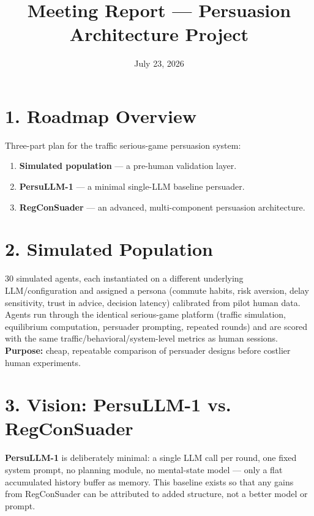 \documentclass[10pt]{article}
\title{\vspace{-1.5em}\large\textbf{Meeting Report --- Persuasion Architecture Project}}
\author{}
\date{\vspace{-1em}July 23, 2026}
\begin{document}
\maketitle
\vspace{-1.5em}

\section*{1. Roadmap Overview}
Three-part plan for the traffic serious-game persuasion system:
\begin{enumerate}
  \item \textbf{Simulated population} --- a pre-human validation layer.
  \item \textbf{PersuLLM-1} --- a minimal single-LLM baseline persuader.
  \item \textbf{RegConSuader} --- an advanced, multi-component persuasion architecture.
\end{enumerate}

\section*{2. Simulated Population}
30 simulated agents, each instantiated on a different underlying LLM/configuration and assigned a persona (commute habits, risk aversion, delay sensitivity, trust in advice, decision latency) calibrated from pilot human data. Agents run through the identical serious-game platform (traffic simulation, equilibrium computation, persuader prompting, repeated rounds) and are scored with the same traffic/behavioral/system-level metrics as human sessions. \textbf{Purpose:} cheap, repeatable comparison of persuader designs before costlier human experiments.

\section*{3. Vision: PersuLLM-1 vs. RegConSuader}
\textbf{PersuLLM-1} is deliberately minimal: a single LLM call per round, one fixed system prompt, no planning module, no mental-state model --- only a flat accumulated history buffer as memory. This baseline exists so that any gains from RegConSuader can be attributed to added structure, not a better model or prompt.
\end{document}
